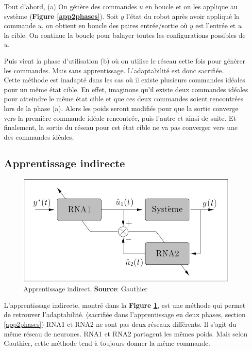 Tout d'abord, (a) On génère des commandes $u$ en boucle et on les applique au système (\textbf{Figure \ref{app2phases}}).
Soit $y$ l'état du robot après avoir appliqué la commande $u$, on obtient en boucle des paires entrée/sortie où $y$ est l'entrée et $u$ la cible.
On continue la boucle pour balayer toutes les configurations possibles de $u$.

Puis vient la phase d'utilisation (b) où on utilise le réseau cette fois pour génèrer les commandes. Mais sans apprentissage. L'adaptabilité est donc sacrifiée.\\

Cette méthode est inadapté dans les cas où il existe plusieurs commandes idéales pour un même état cible.
En effet, imaginons qu'il existe deux commandes idéales pour atteindre le même état cible et que ces deux commandes soient rencontrées lors de la phase (a).
Alors les poids seront modifiés pour que la sortie converge vers la première commande idéale rencontrée, puis l'autre et ainsi de suite.
Et finalement, la sortie du réseau pour cet état cible ne va pas converger vers une des commandes idéales.

\subsection{Apprentissage indirecte}\label{sec:appindirect}
\begin{figure}
 \centering
 \includegraphics[scale=0.5]{../figures/appindirect.jpg}
 \caption{Apprentissage indirect. \textbf{Source}: Gauthier\cite{Gauthier}}
 \label{appindirect}
\end{figure}
L'apprentissage indirecte, montré dans la \textbf{Figure \ref{appindirect}}, est une méthode qui permet de retrouver l'adaptabilité. (sacrifiée dans l'apprentissage en deux phases, section \ref{app2phases})
RNA1 et RNA2 ne sont pas deux réseaux différents. Il s'agit du même réseau de neurones.
RNA1 et RNA2 partagent les mêmes poids.
Mais selon Gauthier\cite{Gauthier}, cette méthode tend à toujours donner la même commande.

